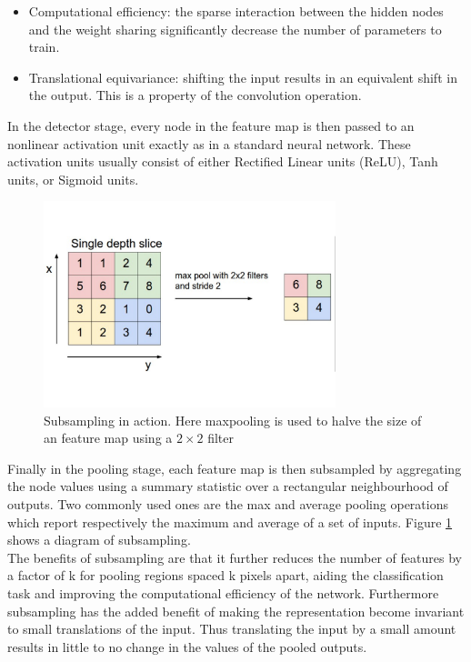 \begin{itemize}
	\item Computational efficiency: the sparse interaction between the hidden nodes and the weight sharing significantly decrease the number of parameters to train.
	\item Translational equivariance: shifting the input results in an equivalent shift in the output. This is a property of the convolution operation.
\end{itemize}

\noindent In the detector stage, every node in the feature map is then passed to an nonlinear activation unit exactly as in a standard neural network. These activation units usually consist of either Rectified Linear units (ReLU), Tanh units, or Sigmoid units.\\

\begin{figure}
\centering
\label{subsampling}
\includegraphics[trim=0cm 0cm 0cm 0cm, clip=true, height=60mm]{Chapter2/pooling.pdf}
\caption{Subsampling in action. Here maxpooling is used to halve the size of an feature map using a $2 \times 2$ filter}
\end{figure}

\noindent Finally in the pooling stage, each feature map is then subsampled by aggregating the node values using a summary statistic over a rectangular neighbourhood of outputs. Two commonly used ones are the max and average pooling operations which report respectively the maximum and average of a set of inputs. Figure \ref{subsampling} shows a diagram of subsampling.\\

\noindent The benefits of subsampling are that it further reduces the number of features by a factor of k for pooling regions spaced k pixels apart, aiding the classification task and improving the computational efficiency of the network. Furthermore subsampling has the added benefit of making the representation become invariant to small translations of the input. Thus translating the input by a small amount results in little to no change in the values of the pooled outputs.\\

